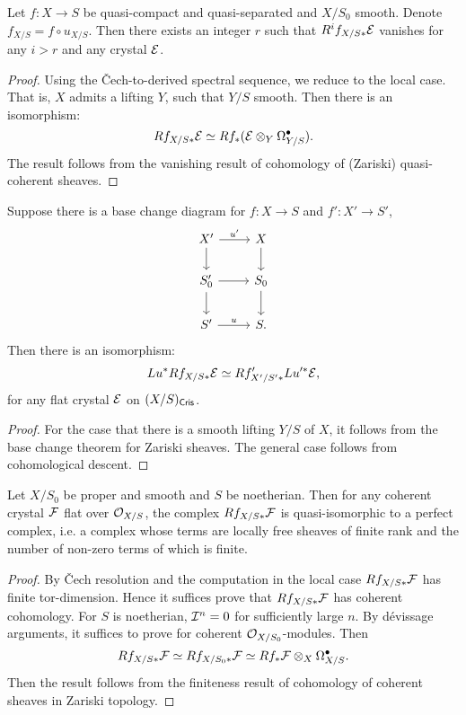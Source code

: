 \begin{theorem}
    Let $f \colon X \to S$ be quasi-compact 
    and quasi-separated and $X/S_0$ smooth. 
    Denote $f_{X/S} = f \circ u_{X/S}$. 
    Then there exists an integer $r$ such that 
    $R^i f_{X/S*} {\mathcal {E}}$ vanishes for any $i>r$ and any crystal ${\mathcal {E}}$.
\end{theorem}

\begin{proof}
    Using the \v Cech-to-derived spectral sequence, 
    we reduce to the local case. 
    That is, $X$ admits a lifting $Y$, such that $Y/S$ smooth. 
    Then there is an isomorphism:
    \[
        Rf_{X/S*} {\mathcal {E}} \simeq Rf_* ({\mathcal {E}} \otimes_Y \Omega_{Y/S}^\bullet).
    \]
    The result follows from the vanishing result of 
    cohomology of (Zariski) quasi-coherent sheaves.
\end{proof}
\begin{theorem}
    Suppose there is a base change diagram for 
    $f \colon X \to S$ and $f' \colon X' \to S'$,
    \[
        \begin{tikzcd}
            X' \ar[r,"{u'}"] \ar[d] & X \ar[d] \\
            S_0' \ar[r] \ar[d] & S_0 \ar[d] \\
            S' \ar[r,"u"] & S.
        \end{tikzcd}
    \]
    Then there is an isomorphism:
    \[
        Lu^* Rf_{X/S*} {\mathcal {E}} \simeq Rf'_{X'/S'*} Lu'^*{\mathcal {E}},
    \]
    for any flat crystal ${\mathcal {E}}$ on $(X/S)_{\mathsf{Cris}}$.
\end{theorem}

\begin{proof}
    For the case that there is a smooth lifting $Y/S$ of $X$, 
    it follows from the base change theorem for Zariski sheaves. 
    The general case follows from cohomological descent.
\end{proof}

\begin{theorem}
    Let $X/S_0$ be proper and smooth and $S$ be noetherian. 
    Then for any coherent crystal ${\mathcal {F}}$ flat over ${\mathcal {O}}_{X/S}$, 
    the complex $Rf_{X/S*}{\mathcal {F}}$ is quasi-isomorphic to a perfect complex, 
    i.e. a complex whose terms are locally free sheaves of finite rank 
    and the number of non-zero terms of which is finite.
\end{theorem}

\begin{proof}
    By \v Cech resolution and the computation in the local case 
    $Rf_{X/S*} {\mathcal {F}}$ has finite tor-dimension. 
    Hence it suffices prove that $Rf_{X/S*} {\mathcal {F}}$ has coherent cohomology. 
    For $S$ is noetherian, ${\mathcal {I}}^n = 0$ for sufficiently large $n$. 
    By d\'evissage arguments, 
    it suffices to prove for coherent ${\mathcal {O}}_{X/S_0}$-modules. 
    Then 
    \[
        Rf_{X/S*} {\mathcal {F}} \simeq Rf_{X/S_0*} {\mathcal {F}} 
        \simeq Rf_* {\mathcal {F}} \otimes_X \Omega_{X/S}^\bullet.
    \]
    Then the result follows from the finiteness result 
    of cohomology of coherent sheaves in Zariski topology.
\end{proof}

